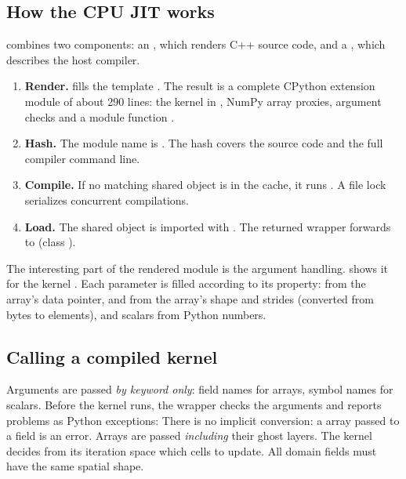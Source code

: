 \subsection{How the CPU JIT works}
 combines two components: an , which renders
C++ source code, and a , which describes the host compiler.
\begin{enumerate}
  \item \textbf{Render.}  fills the template
        . The result is a complete CPython
        extension module of about 290 lines: the kernel in ,
        NumPy array proxies, argument checks and a module function .
  \item \textbf{Hash.} The module name is . The hash covers the
        source code and the full compiler command line.
  \item \textbf{Compile.} If no matching shared object is in the cache, it runs
        . A file lock serializes concurrent compilations.
  \item \textbf{Load.} The shared object is imported with . The
        returned wrapper forwards  to  (class
        ).
\end{enumerate}
The interesting part of the rendered module is the argument handling.
 shows it for the kernel . Each parameter is filled
according to its property:  from the array's data pointer,
 and  from the array's shape and strides (converted
from bytes to elements), and scalars from Python numbers.

\subsection{Calling a compiled kernel}
Arguments are passed \emph{by keyword only}: field names for arrays, symbol names for
scalars. Before the kernel runs, the wrapper checks the arguments and reports problems
as Python exceptions:
There is no implicit conversion: a  array passed to a  field
is an error. Arrays are passed \emph{including} their ghost layers. The kernel decides
from its iteration space which cells to update. All  domain fields must
have the same spatial shape.

